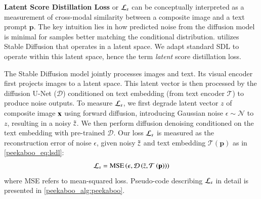 \textbf{Latent Score Distillation Loss} or $\mathcal{L}_{s}$ can be conceptually interpreted as a measurement of cross-modal similarity between a composite image and a text prompt $\mathbf{p}$. 
The key intuition lies in how predicted noise from the diffusion model is minimal for samples better matching the conditional distribution.
\modelname utilizes Stable Diffusion that operates in a latent space. We adapt standard SDL to operate within this latent space, hence the term \emph{latent} score distillation loss.

The Stable Diffusion model jointly processes images and text. Its visual encoder first projects images to a latent space. This latent vector is then processed by the diffusion U-Net ($\mathcal{D}$) conditioned on text embedding (from text encoder $\mathcal{T}$) to produce noise outputs.   
To measure $\mathcal{L}_{s}$, we first degrade latent vector $z$ of composite image $\mathbf{x}$ using forward diffusion, introducing Gaussian noise $\epsilon \sim \mathcal{N}$ to $z$, resulting in a noisy $\Tilde{z}$.
We then perform diffusion denoising conditioned on the text embedding with pre-trained $\mathcal{D}$. 
Our loss $\mathcal{L}_{s}$ is measured as the reconstruction error of noise $\epsilon$, given noisy $\Tilde{z}$ and text embedding $\mathcal{T}\left( \mathbf{p} \right)$ as in \cref{peekaboo_eq:lsdl}:
\begin{equation}
\label{peekaboo_eq:lsdl}
    \mathcal{L}_{s} = \mathrm{MSE}\left( \epsilon, \mathcal{D}\left(\Tilde{z}, \mathcal{T}\left( \mathbf{p} \right) \right) \right)
\end{equation}
where MSE refers to mean-squared loss. Pseudo-code describing $\mathcal{L}_{s}$ in detail is presented in \cref{peekaboo_alg:peekaboo}.

